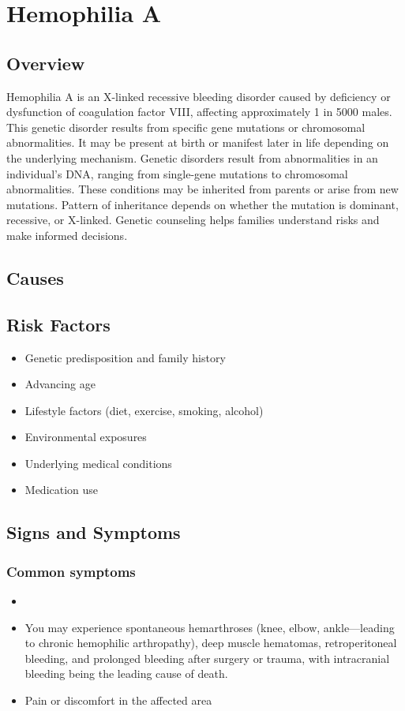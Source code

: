 \chapter{Hemophilia A}
\label{sec:Hemophilia A}

\section{Overview}
Hemophilia A is an X-linked recessive bleeding disorder caused by deficiency or dysfunction of coagulation factor VIII, affecting approximately 1 in 5000 males. This genetic disorder results from specific gene mutations or chromosomal abnormalities. It may be present at birth or manifest later in life depending on the underlying mechanism. Genetic disorders result from abnormalities in an individual's DNA, ranging from single-gene mutations to chromosomal abnormalities. These conditions may be inherited from parents or arise from new mutations. Pattern of inheritance depends on whether the mutation is dominant, recessive, or X-linked. Genetic counseling helps families understand risks and make informed decisions.
\section{Causes}
\section{Risk Factors}

\begin{itemize}[noitemsep]
  \item Genetic predisposition and family history
  \item Advancing age
  \item Lifestyle factors (diet, exercise, smoking, alcohol)
  \item Environmental exposures
  \item Underlying medical conditions
  \item Medication use
\end{itemize}
\section{Signs and Symptoms}

\subsection{Common symptoms}
\begin{itemize}[noitemsep]
  \item \item You may experience spontaneous hemarthroses (knee, elbow, ankle---leading to chronic hemophilic arthropathy), deep muscle hematomas, retroperitoneal bleeding, and prolonged bleeding after surgery or trauma, with intracranial bleeding being the leading cause of death.

  \item Pain or discomfort in the affected area
  \end{itemize}

